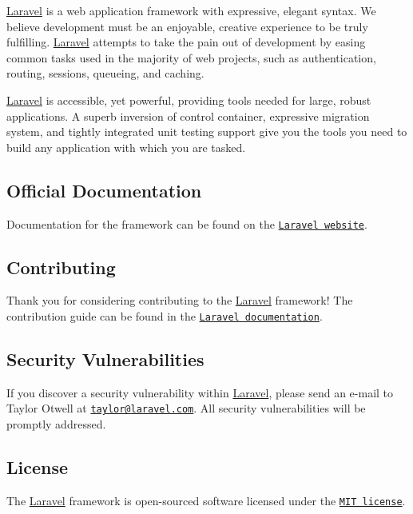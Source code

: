 \href{https://travis-ci.org/laravel/framework}{\tt } \href{https://packagist.org/packages/laravel/framework}{\tt } \href{https://packagist.org/packages/laravel/framework}{\tt } \href{https://packagist.org/packages/laravel/framework}{\tt } \href{https://packagist.org/packages/laravel/framework}{\tt }

\mbox{\hyperlink{namespace_laravel}{Laravel}} is a web application framework with expressive, elegant syntax. We believe development must be an enjoyable, creative experience to be truly fulfilling. \mbox{\hyperlink{namespace_laravel}{Laravel}} attempts to take the pain out of development by easing common tasks used in the majority of web projects, such as authentication, routing, sessions, queueing, and caching.

\mbox{\hyperlink{namespace_laravel}{Laravel}} is accessible, yet powerful, providing tools needed for large, robust applications. A superb inversion of control container, expressive migration system, and tightly integrated unit testing support give you the tools you need to build any application with which you are tasked.

\subsection*{Official Documentation}

Documentation for the framework can be found on the \href{http://laravel.com/docs}{\tt Laravel website}.

\subsection*{Contributing}

Thank you for considering contributing to the \mbox{\hyperlink{namespace_laravel}{Laravel}} framework! The contribution guide can be found in the \href{http://laravel.com/docs/contributions}{\tt Laravel documentation}.

\subsection*{Security Vulnerabilities}

If you discover a security vulnerability within \mbox{\hyperlink{namespace_laravel}{Laravel}}, please send an e-\/mail to Taylor Otwell at \href{mailto:taylor@laravel.com}{\tt taylor@laravel.\+com}. All security vulnerabilities will be promptly addressed.

\subsection*{License}

The \mbox{\hyperlink{namespace_laravel}{Laravel}} framework is open-\/sourced software licensed under the \href{http://opensource.org/licenses/MIT}{\tt M\+IT license}. 